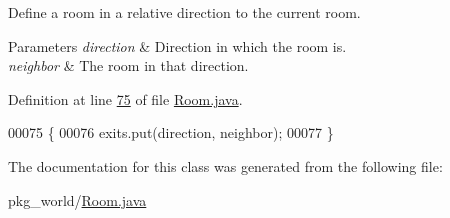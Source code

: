 Define a room in a relative direction to the current room. 


\begin{DoxyParams}{Parameters}
{\em direction} & Direction in which the room is. \\
\hline
{\em neighbor} & The room in that direction. \\
\hline
\end{DoxyParams}


Definition at line \hyperlink{Room_8java_source_l00075}{75} of file \hyperlink{Room_8java_source}{Room.\-java}.


\begin{DoxyCode}
00075                                                          \{
00076         exits.put(direction, neighbor);
00077     \}
\end{DoxyCode}


The documentation for this class was generated from the following file\-:\begin{DoxyCompactItemize}
\item 
pkg\-\_\-world/\hyperlink{Room_8java}{Room.\-java}\end{DoxyCompactItemize}
